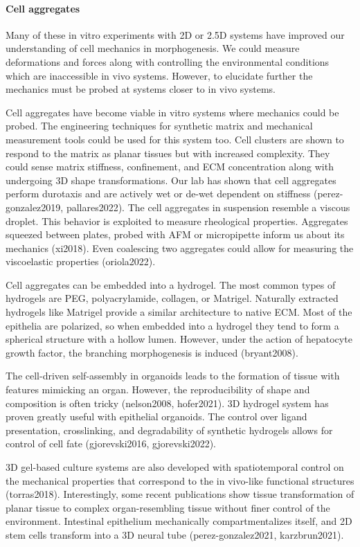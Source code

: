 \documentclass[
]{article}
\begin{document}
\hypertarget{cell-aggregates}{%
\paragraph{Cell aggregates}\label{cell-aggregates}}

Many of these in vitro experiments with 2D or 2.5D systems have improved
our understanding of cell mechanics in morphogenesis. We could measure
deformations and forces along with controlling the environmental
conditions which are inaccessible in vivo systems. However, to elucidate
further the mechanics must be probed at systems closer to in vivo
systems.

Cell aggregates have become viable in vitro systems where mechanics
could be probed. The engineering techniques for synthetic matrix and
mechanical measurement tools could be used for this system too. Cell
clusters are shown to respond to the matrix as planar tissues but with
increased complexity. They could sense matrix stiffness, confinement,
and ECM concentration along with undergoing 3D shape transformations.
Our lab has shown that cell aggregates perform durotaxis and are
actively wet or de-wet dependent on stiffness (perez-gonzalez2019,
pallares2022). The cell aggregates in suspension resemble a viscous
droplet. This behavior is exploited to measure rheological properties.
Aggregates squeezed between plates, probed with AFM or micropipette
inform us about its mechanics (xi2018). Even coalescing two aggregates
could allow for measuring the viscoelastic properties (oriola2022).

Cell aggregates can be embedded into a hydrogel. The most common types
of hydrogels are PEG, polyacrylamide, collagen, or Matrigel. Naturally
extracted hydrogels like Matrigel provide a similar architecture to
native ECM. Most of the epithelia are polarized, so when embedded into a
hydrogel they tend to form a spherical structure with a hollow lumen.
However, under the action of hepatocyte growth factor, the branching
morphogenesis is induced (bryant2008).

The cell-driven self-assembly in organoids leads to the formation of
tissue with features mimicking an organ. However, the reproducibility of
shape and composition is often tricky (nelson2008, hofer2021). 3D
hydrogel system has proven greatly useful with epithelial organoids. The
control over ligand presentation, crosslinking, and degradability of
synthetic hydrogels allows for control of cell fate (gjorevski2016,
gjorevski2022).

3D gel-based culture systems are also developed with spatiotemporal
control on the mechanical properties that correspond to the in vivo-like
functional structures (torras2018). Interestingly, some recent
publications show tissue transformation of planar tissue to complex
organ-resembling tissue without finer control of the environment.
Intestinal epithelium mechanically compartmentalizes itself, and 2D stem
cells transform into a 3D neural tube (perez-gonzalez2021,
karzbrun2021).
\end{document}
